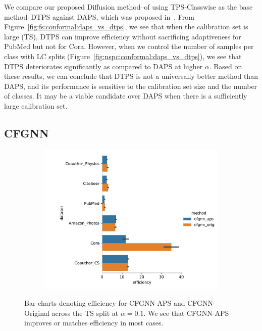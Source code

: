 We compare our proposed Diffusion method--of using TPS-Classwise as the base method--DTPS against DAPS, which was proposed in~\cite{zargarbashi23conformal}.
From Figure~\ref{fig:fs:conformal:daps_vs_dtps}, we see that when the calibration set is large (TS), DTPS can improve efficiency without sacrificing adaptiveness for PubMed but not for Cora.
However, when we control the number of samples per class with LC splits (Figure~\ref{fig:nspc:conformal:daps_vs_dtps}), we see that DTPS deteriorates significantly as compared to DAPS at higher $\alpha$.
Based on these results, we can conclude that DTPS is not a universally better method than DAPS, and its performance is sensitive to the calibration set size and the number of classes.
It may be a viable candidate over DAPS when there is a sufficiently large calibration set.

\subsection{CFGNN}
\begin{figure}
    \centering
    \begin{subfigure}{0.7\linewidth}
        \includegraphics[width=\linewidth]{graphConformal/figures/split/cfgnn_aps_vs_orig_efficiency}
    \end{subfigure}
    \caption{Bar charts denoting efficiency for CFGNN-APS and CFGNN-Original across the TS split at $\alpha=0.1$. We see that CFGNN-APS improves or matches efficiency in most cases.}
    \label{fig:fs:conformal:cfgnn_aps_vs_orig}
\end{figure}


